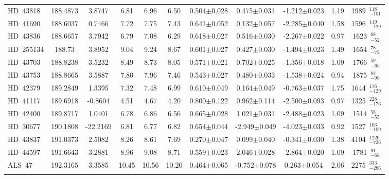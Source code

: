 {\begin{longtable}{lcccccccccc}
\noalign{\smallskip}
HD~43818 & 188.4873 & 3.8747 & 6.81 & 6.96 & 6.50 & 0.504$\pm$0.028 & 0.475$\pm$0.031 & -1.212$\pm$0.023 & 1.19 & 1989~$_{-101}^{118}$ \\
\noalign{\smallskip}
HD~41690 & 188.6037 & 0.7466 & 7.72 & 7.75 & 7.43 & 0.641$\pm$0.052 & 0.132$\pm$0.057 & -2.285$\pm$0.040 & 1.58 & 1596~$_{-129}^{149}$ \\
\noalign{\smallskip}
HD~43836 & 188.6657 & 3.7942 & 6.79 & 7.08 & 6.29 & 0.618$\pm$0.027 & 0.516$\pm$0.030 & -2.267$\pm$0.022 & 0.97 & 1623~$_{-52}^{68}$ \\
\noalign{\smallskip}
HD~255134 & 188.73 & 3.8952 & 9.04 & 9.24 & 8.67 & 0.601$\pm$0.027 & 0.427$\pm$0.030 & -1.494$\pm$0.023 & 1.49 & 1654~$_{-72}^{78}$ \\
\noalign{\smallskip}
HD~43703 & 188.8238 & 3.5232 & 8.49 & 8.73 & 8.05 & 0.571$\pm$0.021 & 0.702$\pm$0.025 & -1.356$\pm$0.018 & 1.09 & 1766~$_{-65}^{59}$ \\
\noalign{\smallskip}
HD~43753 & 188.8665 & 3.5887 & 7.80 & 7.96 & 7.46 & 0.543$\pm$0.027 & 0.480$\pm$0.033 & -1.538$\pm$0.024 & 0.94 & 1875~$_{-98}^{82}$ \\
\noalign{\smallskip}
HD~42379 & 189.2849 & 1.3395 & 7.32 & 7.48 & 6.99 & 0.610$\pm$0.049 & 0.164$\pm$0.049 & -0.763$\pm$0.037 & 1.75 & 1644~$_{-129}^{176}$ \\
\noalign{\smallskip}
HD~41117 & 189.6918 & -0.8604 & 4.51 & 4.67 & 4.20 & 0.800$\pm$0.122 & 0.962$\pm$0.114 & -2.500$\pm$0.093 & 0.97 & 1325~$_{-176}^{228}$ \\
\noalign{\smallskip}
HD~42400 & 189.8717 & 1.0401 & 6.78 & 6.86 & 6.56 & 0.665$\pm$0.028 & 1.021$\pm$0.031 & -2.488$\pm$0.023 & 1.09 & 1514~$_{-55}^{58}$ \\
\noalign{\smallskip}
HD~30677 & 190.1808 & -22.2169 & 6.81 & 6.77 & 6.82 & 0.654$\pm$0.044 & -2.949$\pm$0.049 & -4.023$\pm$0.033 & 0.92 & 1527~$_{-109}^{103}$ \\
\noalign{\smallskip}
HD~43837 & 191.0373 & 2.5082 & 8.26 & 8.61 & 7.69 & 0.270$\pm$0.047 & 0.099$\pm$0.040 & -0.341$\pm$0.030 & 1.38 & 4104~$_{-726}^{1220}$ \\
\noalign{\smallskip}
HD~44597 & 191.6643 & 3.2881 & 8.96 & 9.08 & 8.71 & 0.559$\pm$0.023 & 2.046$\pm$0.028 & -2.864$\pm$0.020 & 1.09 & 1781~$_{-68}^{91}$ \\
\noalign{\smallskip}
ALS~47 & 192.3165 & 3.3585 & 10.45 & 10.56 & 10.20 & 0.464$\pm$0.065 & -0.752$\pm$0.078 & 0.263$\pm$0.054 & 2.06 & 2275~$_{-286}^{333}$ \\
\noalign{\smallskip}

\end{longtable}}
